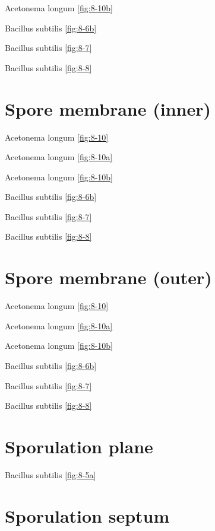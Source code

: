 \documentclass[]{tufte-book}
\begin{document}
Acetonema longum \ref{fig:8-10b}

Bacillus subtilis \ref{fig:8-6b}

Bacillus subtilis \ref{fig:8-7}

Bacillus subtilis \ref{fig:8-8}

\hypertarget{spore-membrane-inner}{%
\section*{Spore membrane (inner)}\label{spore-membrane-inner}}

Acetonema longum \ref{fig:8-10}

Acetonema longum \ref{fig:8-10a}

Acetonema longum \ref{fig:8-10b}

Bacillus subtilis \ref{fig:8-6b}

Bacillus subtilis \ref{fig:8-7}

Bacillus subtilis \ref{fig:8-8}

\hypertarget{spore-membrane-outer}{%
\section*{Spore membrane (outer)}\label{spore-membrane-outer}}

Acetonema longum \ref{fig:8-10}

Acetonema longum \ref{fig:8-10a}

Acetonema longum \ref{fig:8-10b}

Bacillus subtilis \ref{fig:8-6b}

Bacillus subtilis \ref{fig:8-7}

Bacillus subtilis \ref{fig:8-8}

\hypertarget{sporulation-plane}{%
\section*{Sporulation plane}\label{sporulation-plane}}

Bacillus subtilis \ref{fig:8-5a}

\hypertarget{sporulation-septum}{%
\section*{Sporulation septum}\label{sporulation-septum}}
\end{document}
